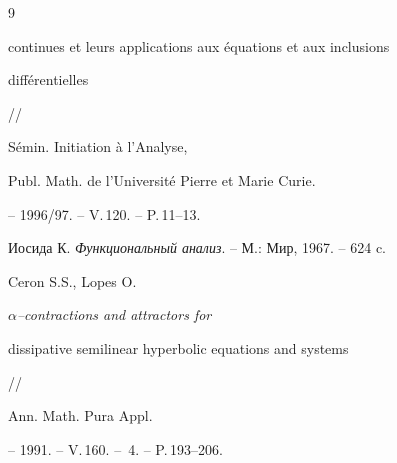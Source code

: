 \begin{thebibliography}{9}
{continues et leurs applications aux \'equations et aux inclusions 


diff\'erentielles} //


S\'emin. Initiation \`a l'Analyse, 


Publ. Math. de l'Universit\'e Pierre et Marie Curie.


-- 1996/97. -- V.\,120. -- P.\,11--13. 




Иосида К. {\em Функциональный анализ}. -- М.: Мир, 1967. -- 624 c. 




Ceron S.S., Lopes O. {\em $\alpha$--contractions and attractors for


dissipative semilinear hyperbolic equations and systems} //


Ann. Math. Pura Appl.


-- 1991. -- V.\,160. -- \No\,4. -- P.\,193--206.





\end{thebibliography}





\vskip 2cm












\label{end}





